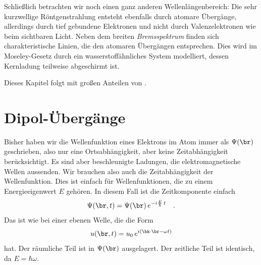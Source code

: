 Schließlich betrachten wir noch einen ganz anderen Wellenlängenbereich: Die sehr kurzwellige Röntgenstrahlung entsteht ebenfalls durch atomare Übergänge, allerdings durch tief gebundene Elektronen und nicht durch Valenzelektronen wie beim sichtbaren Licht. Neben dem breiten \emph{Bremsspektrum} finden sich charakteristische Linien, die den atomaren Übergängen entsprechen. Dies wird im Moseley-Gesetz durch ein wasserstoffähnliches System modelliert, dessen Kernladung teilweise abgeschirmt ist.

Dieses Kapitel folgt \cite{Harris_moderne_Physik} mit großen Anteilen von \cite{Demtröder_ep3}.




\section{Dipol-Übergänge}

Bisher haben wir die Wellenfunktion eines Elektrons im Atom immer als $\Psi(\br)$ geschrieben, also nur eine Ortsabhängigkeit, aber keine Zeitabhängigkeit berücksichtigt. Es sind aber beschleunigte Ladungen, die elektromagnetische Wellen aussenden. Wir brauchen also auch die Zeitabhängigkeit der Wellenfunktion. Dies ist einfach für Wellenfunktionen, die zu einem Energieeigenwert $E$ gehören. In diesem Fall ist die Zeitkomponente einfach 
\begin{equation}
    \Psi(\br, t) = \Psi(\br) \, e^{- i \frac{E}{\hbar} \, t} \quad .
\end{equation}
Das ist wie bei einer ebenen Welle, die die Form 
\begin{equation}
    u(\br, t) = u_0 \, e^{i ( \bk \cdot \br - \omega t)}
\end{equation}
hat. Der räumliche Teil ist in $\Psi(\br)$ ausgelagert. Der zeitliche Teil ist identisch, da $E = \hbar \omega$.

